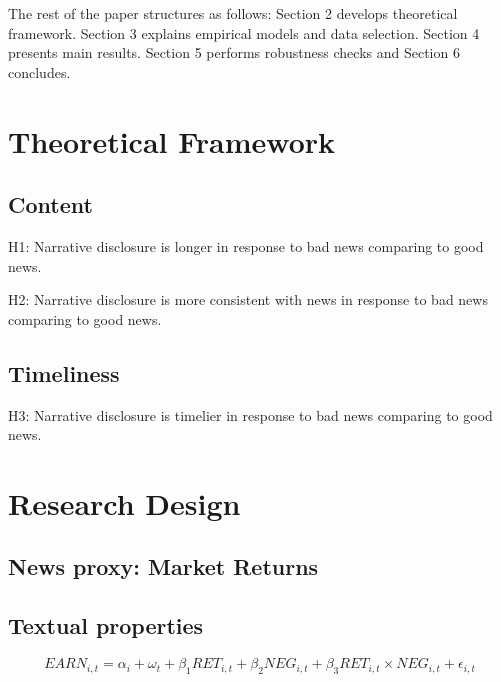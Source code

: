 \documentclass[a4paper]{article}
\begin{document}
\begin{spacing}{2}


The rest of the paper structures as follows: Section 2 develops theoretical framework. Section 3 explains empirical models and data selection. Section 4 presents main results. Section 5 performs robustness checks and Section 6 concludes.

\section{Theoretical Framework}

\subsection{Content}
\begin{center}
	H1: Narrative disclosure is longer in response to bad news comparing to good news.
\end{center}

\begin{center}
	H2: Narrative disclosure is more consistent with news in response to bad news comparing to good news.
\end{center}

\subsection{Timeliness}
\begin{center}
	H3: Narrative disclosure is timelier in response to bad news comparing to good news.
\end{center}

\section{Research Design}
\subsection{News proxy: Market Returns}

\subsection{Textual properties}

 \begin{equation}
 	EARN_{i,t}=\alpha_i+\omega_t+\beta_1RET_{i,t}+\beta_2NEG_{i,t}+\beta_3RET_{i,t}\times NEG_{i,t}+\epsilon_{i,t}
 \end{equation}


\end{spacing}
\end{document}

